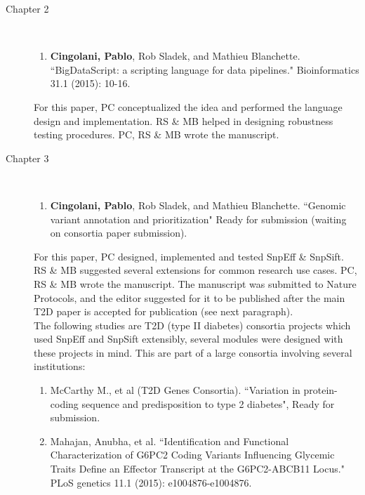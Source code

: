 \begin{description}
	
	\item[Chapter 2] ~ 
	
		\begin{enumerate}[resume]
		\item \textbf{Cingolani, Pablo}, Rob Sladek, and Mathieu Blanchette. ``BigDataScript: a scripting language for data pipelines." Bioinformatics 31.1 (2015): 10-16.
		\end{enumerate}

		For this paper, PC conceptualized the idea and performed the language design and implementation. RS \& MB helped in designing robustness testing procedures. PC, RS \& MB wrote the manuscript.
		\\
	
	\item[Chapter 3] ~
	
		\begin{enumerate}[resume]
			\item \textbf{Cingolani, Pablo}, Rob Sladek, and Mathieu Blanchette. ``Genomic variant annotation and prioritization" Ready for submission (waiting on consortia paper submission).
		\end{enumerate}
		
		For this paper, PC designed, implemented and tested SnpEff \& SnpSift. RS \& MB suggested several extensions for common research use cases. PC, RS \& MB wrote the manuscript. The manuscript was submitted to Nature Protocols, and the editor suggested for it to be published after the main T2D paper is accepted for publication (see next paragraph).
		\\

		The following studies are T2D (type II diabetes) consortia projects which used SnpEff and SnpSift extensibly, several modules were designed with these projects in mind. This are part of a large consortia involving several institutions:
	
		\begin{enumerate}[resume]
		
			\item McCarthy M., et al (T2D Genes Consortia). ``Variation in protein-coding sequence and predisposition to type 2 diabetes", Ready for submission.
			
			\item Mahajan, Anubha, et al. ``Identification and Functional Characterization of G6PC2 Coding Variants Influencing Glycemic Traits Define an Effector Transcript at the G6PC2-ABCB11 Locus." PLoS genetics 11.1 (2015): e1004876-e1004876.
		

\end{enumerate}
\end{description}
